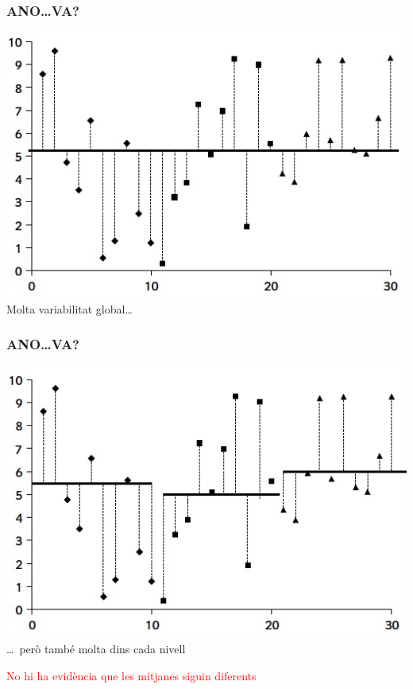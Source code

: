 \documentclass[12pt,t]{beamer}
\newcommand{\red}[1]{\textcolor{red}{#1}}
\theoremstyle{plain}
\theoremstyle{definition}
\begin{document}
\begin{frame}
\frametitle{ANO\ldots VA?}

\begin{center}
\includegraphics[width=0.8\linewidth]{FD2-1}\\
Molta variabilitat global\ldots 
\end{center}
\end{frame}

\begin{frame}
\frametitle{ANO\ldots VA?}

\begin{center}
\includegraphics[width=0.8\linewidth]{FD2-2}\\
\ldots\ però també molta dins cada nivell\\ \pause
\medskip

\red{No hi ha evidència que les mitjanes siguin diferents}
\end{center}
\end{frame}
\end{document}
